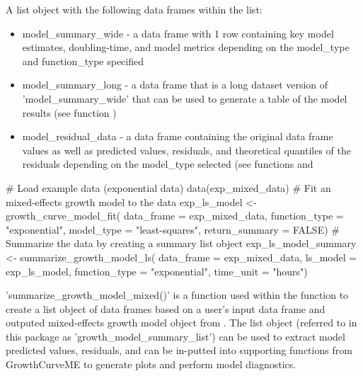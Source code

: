 \documentclass[a4paper]{book}
\begin{document}
\begin{Value}
A list object with the following data frames within the list:
\begin{itemize}

\item{} model\_summary\_wide - a data frame with 1 row containing
key model estimates, doubling-time, and model metrics depending
on the model\_type and function\_type specified
\item{} model\_summary\_long - a data frame that is a long dataset version of
'model\_summary\_wide' that can be used to generate a table of the model
results (see function )
\item{} model\_residual\_data - a data frame containing the original data
frame values as well as predicted values, residuals, and theoretical
quantiles of the residuals depending on the model\_type selected
(see functions  and

\end{itemize}

\end{Value}
%
\begin{SeeAlso}
\end{SeeAlso}
%
\begin{Examples}
\begin{ExampleCode}
# Load example data (exponential data)
data(exp_mixed_data)
# Fit an mixed-effects growth model to the data
exp_ls_model <- growth_curve_model_fit(
data_frame = exp_mixed_data,
function_type = "exponential",
model_type = "least-squares",
return_summary = FALSE)
# Summarize the data by creating a summary list object
exp_ls_model_summary <- summarize_growth_model_ls(
data_frame = exp_mixed_data,
ls_model = exp_ls_model,
function_type = "exponential",
time_unit = "hours")
\end{ExampleCode}
\end{Examples}
%
\begin{Description}
'summarize\_growth\_model\_mixed()' is a function used within the
 function to create a list object of
data frames based on a user's input data frame and outputed mixed-effects
growth model object from .
The list object (referred to in this package as 'growth\_model\_summary\_list')
can be used to extract model predicted values, residuals, and can be
in-putted into supporting functions from GrowthCurveME to generate plots and
perform model diagnostics.
\end{Description}
\end{document}
